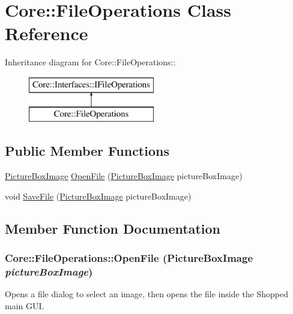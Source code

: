 \hypertarget{class_core_1_1_file_operations}{
\section{Core::FileOperations Class Reference}
\label{class_core_1_1_file_operations}
}
Inheritance diagram for Core::FileOperations::\begin{figure}[H]
\begin{center}
\leavevmode
\includegraphics[height=2cm]{class_core_1_1_file_operations}
\end{center}
\end{figure}
\subsection*{Public Member Functions}
\begin{DoxyCompactItemize}
\item 
\hyperlink{class_core_1_1_images_1_1_picture_box_image}{PictureBoxImage} \hyperlink{class_core_1_1_file_operations_a108130b2bd87d432c0fbbb4f6a42c662}{OpenFile} (\hyperlink{class_core_1_1_images_1_1_picture_box_image}{PictureBoxImage} pictureBoxImage)
\item 
void \hyperlink{class_core_1_1_file_operations_a0fc5427e96d79e70c6409ec22e70abba}{SaveFile} (\hyperlink{class_core_1_1_images_1_1_picture_box_image}{PictureBoxImage} pictureBoxImage)
\end{DoxyCompactItemize}


\subsection{Member Function Documentation}
\hypertarget{class_core_1_1_file_operations_a108130b2bd87d432c0fbbb4f6a42c662}{
\subsubsection[{OpenFile}]{ Core::FileOperations::OpenFile ({\bf PictureBoxImage} {\em pictureBoxImage})}}
\label{class_core_1_1_file_operations_a108130b2bd87d432c0fbbb4f6a42c662}
Opens a file dialog to select an image, then opens the file inside the Shopped main GUI.


